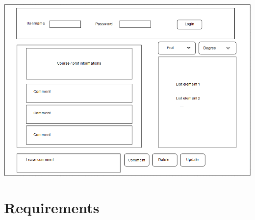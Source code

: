 \documentclass[a4paper, oneside]{article}
\begin{document}
\begin{minipage}{\linewidth}
\begin{center}
\vspace{8mm}
\includegraphics[width=\textwidth]{./images/diagrams/Mockup.pdf} 
\vspace{3mm}
\label{fig:mockup}
\end{center}
\end{minipage}

\clearpage

\section{Requirements}
\end{document}
